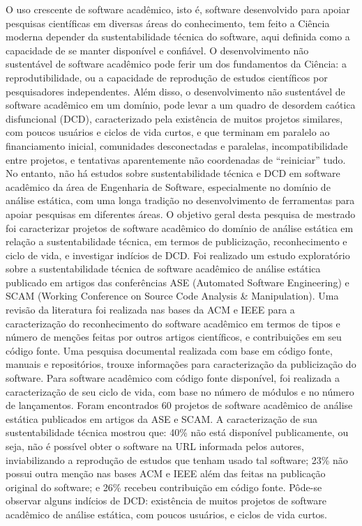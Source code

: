 O uso crescente de software acadêmico, isto é, software desenvolvido para
apoiar pesquisas científicas em diversas áreas do conhecimento, tem feito
a Ciência moderna depender da sustentabilidade técnica do software, aqui
definida como a capacidade de se manter disponível e confiável.
%
O desenvolvimento não sustentável de software acadêmico pode ferir um dos
fundamentos da Ciência: a reprodutibilidade, ou a capacidade de reprodução de
estudos científicos por pesquisadores independentes.
%
Além disso, o desenvolvimento não sustentável de software acadêmico em um
domínio, pode levar a um quadro de desordem caótica disfuncional (DCD),
caracterizado pela existência de muitos projetos similares, com poucos usuários
e ciclos de vida curtos, e que terminam em paralelo ao financiamento inicial,
comunidades desconectadas e paralelas, incompatibilidade entre projetos, e
tentativas aparentemente não coordenadas de ``reiniciar'' tudo.
%
No entanto, não há %
estudos sobre sustentabilidade técnica e DCD em software acadêmico da
área de Engenharia de Software, especialmente no domínio de análise estática,
com uma longa tradição no desenvolvimento de ferramentas para apoiar pesquisas
em diferentes áreas.
%
O objetivo geral desta pesquisa de mestrado foi caracterizar projetos de
software acadêmico do domínio de análise estática em relação a sustentabilidade
técnica, em termos de publicização, reconhecimento e ciclo de vida, 
e investigar indícios de DCD.
%
Foi realizado um estudo exploratório sobre a sustentabilidade técnica de
software acadêmico de análise estática publicado em artigos das conferências
ASE (Automated Software Engineering) e SCAM (Working Conference on Source Code
Analysis \& Manipulation).
%
Uma revisão da literatura foi realizada nas bases da ACM e IEEE
para a caracterização do reconhecimento do software acadêmico
em termos de tipos e número de menções feitas por outros artigos científicos, e
contribuições em seu código fonte.
%
Uma pesquisa documental realizada com base em código fonte, manuais e
repositórios, trouxe informações para caracterização da publicização do software.
%
Para software acadêmico com código fonte disponível, 
foi realizada a caracterização de seu ciclo de vida,
com base no número de módulos e no número de lançamentos.
%
Foram encontrados 60 projetos de software acadêmico de análise estática
publicados em artigos da ASE e SCAM.
%
A caracterização de sua sustentabilidade técnica mostrou que: 
40\% não está disponível publicamente, ou seja, não é possível obter 
o software na URL informada pelos autores, inviabilizando 
a reprodução de estudos que tenham usado tal software;
%
23\% não possui outra menção nas bases ACM e IEEE além das feitas na publicação original
do software; e 26\% recebeu contribuição em código fonte.
%
Pôde-se observar alguns indícios de DCD: 
existência de muitos projetos de software acadêmico de análise estática, %
com poucos usuários, e ciclos de vida curtos.
